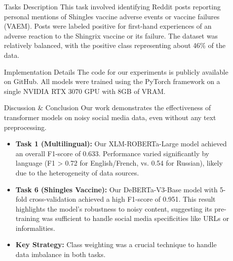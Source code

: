 \documentclass[final]{beamer}
\newlength{\sepwidth}
\newlength{\colwidth}
\newcommand{\separatorcolumn}{\begin{column}{\sepwidth}\end{column}}
\begin{document}
\begin{frame}[t]
\begin{columns}[t]
\begin{column}{\colwidth}
\begin{block}{Tasks Description}
    This task involved identifying Reddit posts reporting personal mentions of Shingles vaccine adverse events or vaccine failures (VAEM). Posts were labeled positive for first-hand experiences of an adverse reaction to the Shingrix vaccine or its failure. The dataset was relatively balanced, with the positive class representing about 46\% of the data.
  \end{block}
  
  \vfill %

    \begin{block}{Implementation Details}
    The code for our experiments is publicly available on GitHub. All models were trained using the PyTorch framework on a single NVIDIA RTX 3070 GPU with 8GB of VRAM.
  \end{block}
  
  \begin{alertblock}{Discussion \& Conclusion}
    Our work demonstrates the effectiveness of transformer models on noisy social media data, even without any text preprocessing.
    \begin{itemize}
        \item \textbf{Task 1 (Multilingual):} Our XLM-ROBERTa-Large model achieved an overall F1-score of 0.633. Performance varied significantly by language (F1 > 0.72 for English/French, vs. 0.54 for Russian), likely due to the heterogeneity of data sources.
        \item \textbf{Task 6 (Shingles Vaccine):} Our DeBERTa-V3-Base model with 5-fold cross-validation achieved a high F1-score of 0.951. This result highlights the model's robustness to noisy content, suggesting its pre-training was sufficient to handle social media specificities like URLs or informalities.
        \item \textbf{Key Strategy:} Class weighting was a crucial technique to handle data imbalance in both tasks.
    \end{itemize}
  \end{alertblock}

\end{column}

\separatorcolumn

\begin{column}{\colwidth}


\end{column}
\end{columns}
\end{frame}
\end{document}
